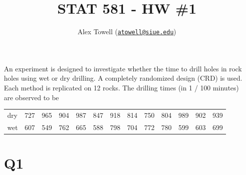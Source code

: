 \documentclass[
  11pt,
]{article}
\title{STAT 581 - HW \#1}
\author{Alex Towell
(\href{mailto:atowell@siue.edu}{\nolinkurl{atowell@siue.edu}})}
\date{}
\newenvironment{Shaded}{\begin{snugshade}}{\end{snugshade}}
\newcommand{\CommentTok}[1]{\textcolor[rgb]{0.56,0.35,0.01}{\textit{#1}}}
\newcommand{\FunctionTok}[1]{\textcolor[rgb]{0.13,0.29,0.53}{\textbf{#1}}}
\newcommand{\NormalTok}[1]{#1}
\newcommand{\OtherTok}[1]{\textcolor[rgb]{0.56,0.35,0.01}{#1}}
\newcommand{\SpecialCharTok}[1]{\textcolor[rgb]{0.81,0.36,0.00}{\textbf{#1}}}
\newcommand{\StringTok}[1]{\textcolor[rgb]{0.31,0.60,0.02}{#1}}
\begin{document}
\maketitle

\begin{Shaded}
\end{Shaded}

An experiment is designed to investigate whether the time to drill holes
in rock holes using wet or dry drilling. A completely randomized design
(CRD) is used. Each method is replicated on 12 rocks. The drilling times
(in 1 / 100 minutes) are observed to be

\begin{longtable}[]{@{}lrrrrrrrrrrrr@{}}
\toprule\noalign{}
\endhead
\bottomrule\noalign{}
\endlastfoot
dry & 727 & 965 & 904 & 987 & 847 & 918 & 814 & 750 & 804 & 989 & 902 &
939 \\
wet & 607 & 549 & 762 & 665 & 588 & 798 & 704 & 772 & 780 & 599 & 603 &
699 \\
\end{longtable}

\hypertarget{q1}{%
\section{Q1}\label{q1}}

\end{document}
